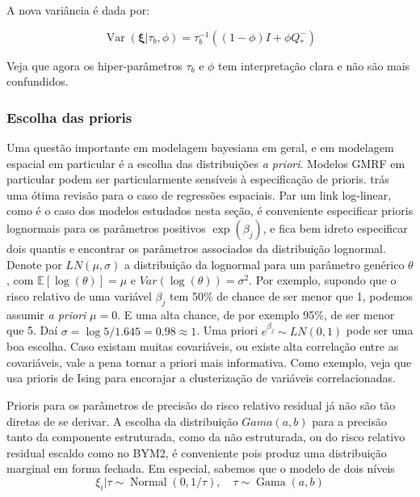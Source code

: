 A nova variância é dada por:

\begin{equation}\label{eq: bym2var}
    \operatorname{Var}(\boldsymbol{\xi}|\tau_b, \phi) = \tau_b^{-1}((1-\phi)I + \phi Q_*^-)
\end{equation}

Veja que agora os hiper-parâmetros $\tau_b$ e $\phi$ tem interpretação clara e não são mais confundidos. 

\subsubsection{Escolha das prioris}

Uma questão importante em modelagem bayesiana em geral, e em modelagem espacial em particular é a escolha das distribuições \textit{a priori}.
Modelos GMRF em particular podem ser particularmente sensíveis à especificação de prioris.
\textcite{Wakefield2007} trás uma ótima revisão para o caso de regressões espaciais. Par um link log-linear, como é o caso dos modelos estudados nesta seção, é conveniente especificar prioris lognormais para os parâmetros positivos $\exp(\beta_j)$, e fica bem idreto especificar dois quantis e encontrar os parâmetros associados da distribuição lognormal. Denote por $LN(\mu, \sigma)$ a distribuição da lognormal para um parâmetro genérico $\theta$, com $\mathds{E}[\log(\theta)] = \mu$ e $Var(\log(\theta)) = \sigma^2$. Por exemplo, supondo que o risco relativo de uma variável $\beta_j$ tem 50\% de chance de ser menor que 1, podemos assumir \textit{a priori} $\mu = 0$. E uma alta chance, de por exemplo 95\%, de ser menor que 5. Daí $\sigma = \log 5 / 1.645 = 0.98 \approx 1$. Uma priori $e^{\beta_j} \sim LN(0, 1)$ pode ser uma boa escolha. Caso existam muitas covariáveis, ou existe alta correlação entre as covariáveis, vale a pena tornar a priori mais informativa. Como exemplo, veja \cite{IsingDP} que usa prioris de Ising para encorajar a clusterização de variáveis correlacionadas.


Prioris para os parâmetros de precisão do risco relativo residual já não são tão diretas de se derivar. A escolha da distribuição $Gama(a,b)$ para a precisão tanto da componente estruturada, como da não estruturada, ou do risco relativo residual escaldo como no BYM2, é conveniente pois produz uma distribuição marginal em forma fechada. Em especial, sabemos que o modelo de dois níveis
\begin{equation*}
    \xi_i|\tau \sim \operatorname{Normal}(0, 1/\tau), \quad \tau \sim \operatorname{Gama}(a,b)
\end{equation*}

